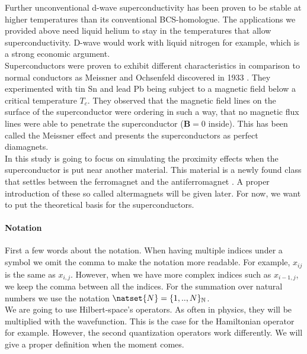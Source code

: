 \documentclass[../main.tex]{subfile}
\begin{document}
Further unconventional d-wave superconductivity has been proven to be stable at higher temperatures than its conventional BCS-homologue.
The applications we provided above need liquid helium to stay in the temperatures that allow superconductivity. D-wave
would work with liquid nitrogen for example, which is a strong economic argument.\\

Superconductors were proven to exhibit different characteristics in comparison to normal conductors as
Meissner and Ochsenfeld discovered in 1933 \cite{MeissnerOchsenfeld1933}. 
They experimented with tin Sn and lead Pb being subject to a magnetic field below a critical temperature $T_c$. They observed that the magnetic field lines on the surface
of the superconductor were ordering in such a way, that no magnetic flux lines were able to penetrate the superconductor ($\bm{B} = 0$ inside). This has been called the Meissner effect
and presents the superconductors as perfect diamagnets.\\

In this study is going to focus on simulating the proximity effects when the superconductor is put near another material. This material is a newly found class 
that settles between the ferromagnet and the antiferromagnet \cite{Smejkal2022}. A proper introduction of these so called altermagnets will be given later.
 For now, we want to put the theoretical basis for the superconductors.\\

\paragraph{Notation}$~$\\
First a few words about the notation. When having multiple indices under a symbol we omit the comma to make the notation more readable. 
For example, $x_{ij}$ is the same as $x_{i,j}$. However, when we have more complex indices such as $x_{i-1, j}$, we keep the comma between all
the indices. For the summation over natural numbers we use the notation $\natset{N} = \{1,..,N\}_{\mathbb{N}}$.\\

We are going to use Hilbert-space's operators. As often in physics, they will be multiplied with the wavefunction. This is the case for the Hamiltonian 
operator for example. However, the second quantization operators work differently. We will give a proper definition when the moment comes.
\end{document}
